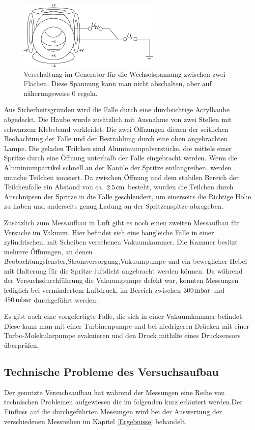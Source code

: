 \documentclass[a4paper,12pt]{article}
\begin{document}
\begin{figure}[htb]
		\centering
		\includegraphics{Schaltbild_Wechselspannung.png}
		\caption{Verschaltung im Generator für die Wechselspannung zwischen zwei Flächen.
			Diese Spannung kann man nicht abschalten, aber auf näherungsweise $0$ regeln.
			\cite{versuchsanleitung}}
		\label{verschaltungres}
\end{figure}

Aus Sicherheitsgründen wird die Falle durch eine durchsichtige Acrylhaube abgedeckt.
Die Haube wurde zusätzlich mit Ausnahme von zwei Stellen mit schwarzem Klebeband verkleidet.
Die zwei Öffnungen dienen der seitlichen Beobachtung der Falle und der Bestrahlung durch eine oben angebrachten Lampe.
Die geladen Teilchen sind Aluminiumpulverstücke, die mittels einer Spritze durch eine Öffnung unterhalb der Falle eingebracht werden.
Wenn die Aluminiumpartikel schnell an der Kanüle der Spritze entlangreiben, werden manche Teilchen ionisiert.
Da zwischen Öffnung und dem stabilen Bereich der Teilchenfalle ein Abstand von ca. $\unit[2.5]{cm}$  besteht,
 wurden die Teilchen durch Anschnipsen der Spritze in die Falle geschleudert, um einerseits die Richtige Höhe zu haben und anderseits genug Ladung an der Spritzenspitze abzugeben.

Zusätzlich zum Messaufbau in Luft gibt es noch einen zweiten Messaufbau für Versuche im Vakuum.
Hier befindet sich eine baugleiche Falle in einer zylindrischen, mit Scheiben versehenen Vakuumkammer.
Die Kammer besitzt mehrere Öffnungen, an denen Beobachtungsfenster,Stromversorgung,Vakuumpumpe und ein beweglicher Hebel mit Halterung für die Spritze luftdicht angebracht werden können.
Da während der Versuchsdurchführung die Vakuumpumpe defekt war,
konnten Messungen lediglich bei vermindertem Luftdruck, im Bereich zwischen $\unit[300]{mbar}$ und $\unit[450]{mbar}$ durchgeführt werden.

Es gibt auch eine vorgefertigte Falle, die sich in einer Vakuumkammer befindet.
Diese kann man mit einer Turbinenpumpe und bei niedrigeren Drücken mit einer Turbo-Molekularpumpe evakuieren und den Druck mithilfe eines Drucksensors überprüfen.

\subsection*{Technische Probleme des Versuchsaufbau}
Der genutzte Versuchsaufbau hat während der Messungen eine Reihe von technischen Problemen aufgewiesen die im folgenden kurz erläutert werden.Der Einfluss
auf die durchgeführten Messungen wird bei der Auswertung der verschiedenen Messreihen im Kapitel \ref{Ergebnisse} behandelt.
\end{document}
